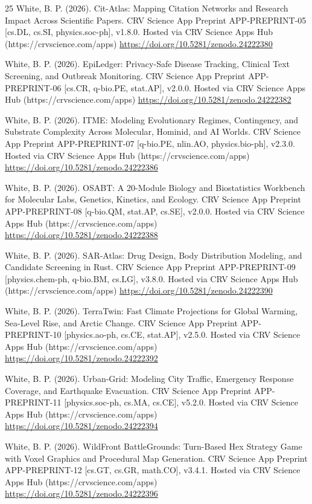 \documentclass[10pt,letterpaper]{article}
\begin{document}
\begin{thebibliography}{25}
 White, B. P. (2026). Cit-Atlas: Mapping Citation Networks and Research Impact Across Scientific Papers. CRV Science App Preprint APP-PREPRINT-05 [cs.DL, cs.SI, physics.soc-ph], v1.8.0. Hosted via CRV Science Apps Hub (https://crvscience.com/apps) \url{https://doi.org/10.5281/zenodo.24222380}

 White, B. P. (2026). EpiLedger: Privacy-Safe Disease Tracking, Clinical Text Screening, and Outbreak Monitoring. CRV Science App Preprint APP-PREPRINT-06 [cs.CR, q-bio.PE, stat.AP], v2.0.0. Hosted via CRV Science Apps Hub (https://crvscience.com/apps) \url{https://doi.org/10.5281/zenodo.24222382}

 White, B. P. (2026). ITME: Modeling Evolutionary Regimes, Contingency, and Substrate Complexity Across Molecular, Hominid, and AI Worlds. CRV Science App Preprint APP-PREPRINT-07 [q-bio.PE, nlin.AO, physics.bio-ph], v2.3.0. Hosted via CRV Science Apps Hub (https://crvscience.com/apps) \url{https://doi.org/10.5281/zenodo.24222386}

 White, B. P. (2026). OSABT: A 20-Module Biology and Biostatistics Workbench for Molecular Labs, Genetics, Kinetics, and Ecology. CRV Science App Preprint APP-PREPRINT-08 [q-bio.QM, stat.AP, cs.SE], v2.0.0. Hosted via CRV Science Apps Hub (https://crvscience.com/apps) \url{https://doi.org/10.5281/zenodo.24222388}

 White, B. P. (2026). SAR-Atlas: Drug Design, Body Distribution Modeling, and Candidate Screening in Rust. CRV Science App Preprint APP-PREPRINT-09 [physics.chem-ph, q-bio.BM, cs.LG], v3.8.0. Hosted via CRV Science Apps Hub (https://crvscience.com/apps) \url{https://doi.org/10.5281/zenodo.24222390}

 White, B. P. (2026). TerraTwin: Fast Climate Projections for Global Warming, Sea-Level Rise, and Arctic Change. CRV Science App Preprint APP-PREPRINT-10 [physics.ao-ph, cs.CE, stat.AP], v2.5.0. Hosted via CRV Science Apps Hub (https://crvscience.com/apps) \url{https://doi.org/10.5281/zenodo.24222392}

 White, B. P. (2026). Urban-Grid: Modeling City Traffic, Emergency Response Coverage, and Earthquake Evacuation. CRV Science App Preprint APP-PREPRINT-11 [physics.soc-ph, cs.MA, cs.CE], v5.2.0. Hosted via CRV Science Apps Hub (https://crvscience.com/apps) \url{https://doi.org/10.5281/zenodo.24222394}

 White, B. P. (2026). WildFront BattleGrounds: Turn-Based Hex Strategy Game with Voxel Graphics and Procedural Map Generation. CRV Science App Preprint APP-PREPRINT-12 [cs.GT, cs.GR, math.CO], v3.4.1. Hosted via CRV Science Apps Hub (https://crvscience.com/apps) \url{https://doi.org/10.5281/zenodo.24222396}


\end{thebibliography}
\end{document}
